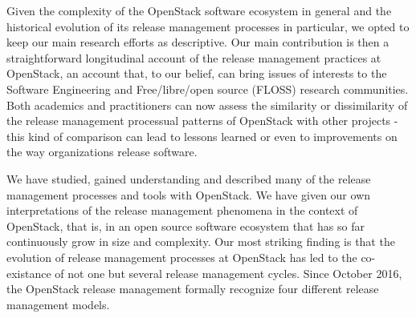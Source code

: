 \documentclass[dvipsnames]{bmcart}
\theoremstyle{definition}
\begin{document}
Given the complexity of the OpenStack software ecosystem in general and the historical evolution of its release management processes in particular, we opted to keep our main research efforts as descriptive. Our main contribution is then a straightforward longitudinal account of the release management practices at OpenStack, an account that, to our belief,  can bring issues of interests to the Software Engineering and Free/libre/open source (FLOSS) research communities. Both academics and practitioners can now assess the similarity or dissimilarity of the release management processual patterns of OpenStack with other projects - this kind of comparison can lead to lessons learned or even to improvements on the way organizations release software.  

We have studied, gained understanding and described many of the release management processes and tools with OpenStack. We have given our own interpretations of the release management phenomena in the context of OpenStack, that is, in an open source software ecosystem that has so far continuously grow in size and complexity. Our most striking finding is that the evolution of release management processes at OpenStack  has led to the co-existance of not one but several release management cycles. Since October 2016, the OpenStack release management formally recognize four different release management models. 
\end{document}
